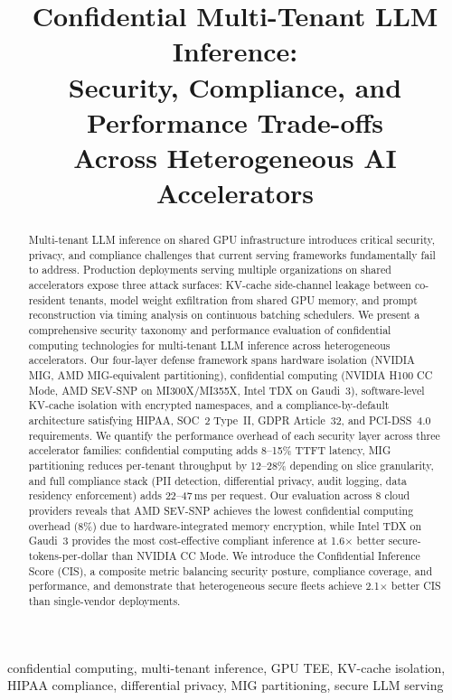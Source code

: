 \documentclass[conference,10pt]{IEEEtran}
\begin{document}
\title{Confidential Multi-Tenant LLM Inference:\\Security, Compliance, and Performance Trade-offs\\Across Heterogeneous AI Accelerators}
\author{
}
\maketitle

\begin{abstract}
Multi-tenant LLM inference on shared GPU infrastructure introduces critical security, privacy, and compliance challenges that current serving frameworks fundamentally fail to address. Production deployments serving multiple organizations on shared accelerators expose three attack surfaces: KV-cache side-channel leakage between co-resident tenants, model weight exfiltration from shared GPU memory, and prompt reconstruction via timing analysis on continuous batching schedulers. We present a comprehensive security taxonomy and performance evaluation of confidential computing technologies for multi-tenant LLM inference across heterogeneous accelerators. Our four-layer defense framework spans hardware isolation (NVIDIA MIG, AMD MIG-equivalent partitioning), confidential computing (NVIDIA H100 CC Mode, AMD SEV-SNP on MI300X/MI355X, Intel TDX on Gaudi~3), software-level KV-cache isolation with encrypted namespaces, and a compliance-by-default architecture satisfying HIPAA, SOC~2 Type~II, GDPR Article~32, and PCI-DSS~4.0 requirements. We quantify the performance overhead of each security layer across three accelerator families: confidential computing adds 8--15\% TTFT latency, MIG partitioning reduces per-tenant throughput by 12--28\% depending on slice granularity, and full compliance stack (PII detection, differential privacy, audit logging, data residency enforcement) adds 22--47\,ms per request. Our evaluation across 8 cloud providers reveals that AMD SEV-SNP achieves the lowest confidential computing overhead (8\%) due to hardware-integrated memory encryption, while Intel TDX on Gaudi~3 provides the most cost-effective compliant inference at 1.6$\times$ better secure-tokens-per-dollar than NVIDIA CC Mode. We introduce the Confidential Inference Score (CIS), a composite metric balancing security posture, compliance coverage, and performance, and demonstrate that heterogeneous secure fleets achieve 2.1$\times$ better CIS than single-vendor deployments.
\end{abstract}
\begin{IEEEkeywords}
confidential computing, multi-tenant inference, GPU TEE, KV-cache isolation, HIPAA compliance, differential privacy, MIG partitioning, secure LLM serving
\end{IEEEkeywords}
\end{document}
